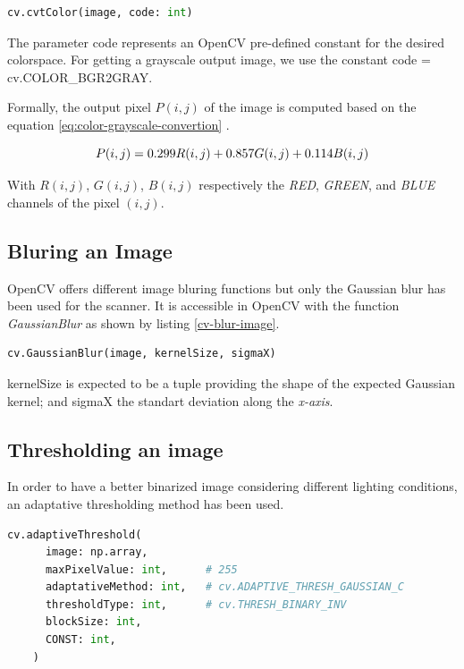 \documentclass{scrartcl}
\newcommand{\param}[1]{{\ttfamily\footnotesize{#1}}}
\begin{document}
  \begin{lstlisting}[language=Python, caption={Convert an image into grayscale}, label={cv-grayscale-image}]    
    cv.cvtColor(image, code: int)
  \end{lstlisting}

  The parameter \param{code} represents an OpenCV pre-defined constant for the desired colorspace. For
  getting a grayscale output image, we use the constant \param{code = cv.COLOR\_BGR2GRAY}.

  Formally, the output pixel $P(i,j)$ of the image is computed based on the equation
  \ref{eq:color-grayscale-convertion} \cite{opencv-book}.

  \begin{equation}
    \centering
    P(i,j) = 0.299R(i,j) + 0.857G(i,j) + 0.114B(i,j)
    \label{eq:color-grayscale-convertion}
  \end{equation}

  With $R(i,j)$, $G(i,j)$, $B(i,j)$ respectively the \textit{RED}, \textit{GREEN}, and \textit{BLUE}
  channels of the pixel $(i,j)$.

  \subsection{Bluring an Image}
  OpenCV offers different image bluring functions but only the Gaussian blur has been used for the
  scanner. It is accessible in OpenCV with the function \textit{GaussianBlur} as shown by listing
  \ref{cv-blur-image}.

  \begin{lstlisting}[language=Python, caption={Bluring an image}, label={cv-blur-image}]
    cv.GaussianBlur(image, kernelSize, sigmaX)
  \end{lstlisting}

  \param{kernelSize} is expected to be a tuple providing the shape of the expected
  Gaussian kernel; and \param{sigmaX} the standart deviation along the \textit{x-axis}.

  \subsection{Thresholding an image}
  In order to have a better binarized image considering different lighting conditions, an
  adaptative thresholding method has been used.

  \begin{lstlisting}[language=Python, caption={Image thresholding}, label={cv-thresholding-image}]
    cv.adaptiveThreshold(
      image: np.array,
      maxPixelValue: int,      # 255
      adaptativeMethod: int,   # cv.ADAPTIVE_THRESH_GAUSSIAN_C
      thresholdType: int,      # cv.THRESH_BINARY_INV
      blockSize: int,
      CONST: int,
    )
  \end{lstlisting}
\end{document}
